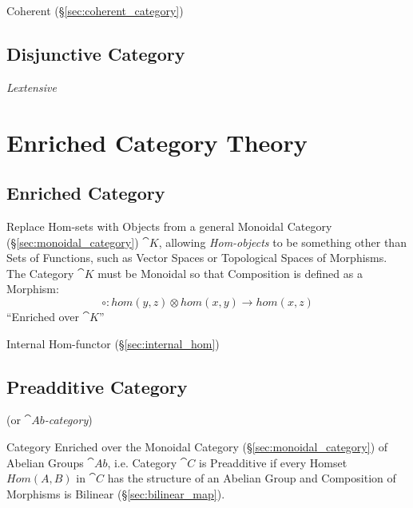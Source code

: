 Coherent (\S\ref{sec:coherent_category})



\subsection{Disjunctive Category}\label{sec:disjunctive_category}

\emph{Lextensive}



\section{Enriched Category Theory}\label{sec:enriched_category_theory}

\subsection{Enriched Category}\label{sec:enriched_category}

Replace Hom-sets with Objects from a general Monoidal Category
(\S\ref{sec:monoidal_category}) $\cat{K}$, allowing \emph{Hom-objects}
to be something other than Sets of Functions, such as Vector Spaces or
Topological Spaces of Morphisms. The Category $\cat{K}$ must be
Monoidal so that Composition is defined as a Morphism:
\[
  \circ : hom(y,z) \otimes hom(x,y) \rightarrow hom(x,z)
\]
``Enriched over $\cat{K}$''

Internal Hom-functor (\S\ref{sec:internal_hom})



\subsection{Preadditive Category}\label{sec:preadditive_category}

(or \emph{$\cat{Ab}$-category})

Category Enriched over the Monoidal Category
(\S\ref{sec:monoidal_category}) of Abelian Groups $\cat{Ab}$, i.e.
Category $\cat{C}$ is Preadditive if every Homset $Hom(A,B)$ in
$\cat{C}$ has the structure of an Abelian Group and Composition of
Morphisms is Bilinear (\S\ref{sec:bilinear_map}).




